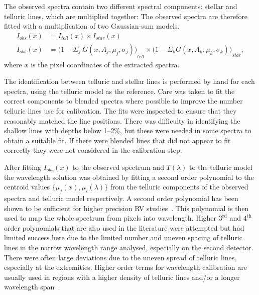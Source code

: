 The observed spectra contain two different spectral components: stellar and telluric lines, which are multiplied together: The observed spectra are therefore fitted with a multiplication of two Gaussian-sum models.
\begin{align}
I_{obs}(x) &= {I}_{tell}(x) \times {I}_{star}(x) \nonumber \\
I_{obs}(x) &= {\Big(1 - {\Sigma}_{j}\ G(x, A_{j}, {\mu}_{j}, {\sigma}_{j})\Big)}_{tell} \times {\Big(1 - {\Sigma}_{k} G(x, A_{k}, {\mu}_{k}, {\sigma}_{k})\Big)}_{star}, \label{eqn:obs}
\end{align}
where \(x\) is the pixel coordinates of the extracted spectra.

The identification between telluric and stellar lines is performed by hand for each spectra, using the telluric model as the reference. Care was taken to fit the correct components to blended spectra where possible to improve the number telluric lines use for calibration. The fits were inspected to ensure that they reasonably matched the line positions. There was difficulty in identifying the shallow lines with depths below 1--2\%, but these were needed in some spectra to obtain a suitable fit. If there were blended lines that did not appear to fit correctly they were not considered in the calibration step.

After fitting \(I_{obs}(x)\) to the observed spectrum and \(T(\lambda)\) to the telluric model the wavelength solution was obtained by fitting a second order polynomial to the centroid values \(\{\mu_{j}(x), \mu_{i}(\lambda)\}\) from the telluric components of the observed spectra and telluric model respectively. A second order polynomial has been shown to be sufficient for higher precision {RV} studies~\citep[e.g.][]{bean_groundbased_2010, figueira_radial_2010}. This polynomial is then used to map the whole spectrum from pixels into wavelength. Higher \(3^{\textrm{rd}}\) and \(4^{\textrm{th}}\) order polynomials that are also used in the literature \citet[e.g.][]{seifahrt_synthesising_2010, ulmer-moll_telluric_2018} were attempted but had limited success here due to the limited number and uneven spacing of telluric lines in the narrow wavelength range analysed, especially on the second detector. There were often large deviations due to the uneven spread of telluric lines, especially at the extremities. Higher order terms for wavelength calibration are usually used in regions with a higher density of telluric lines and/or a longer wavelength span~\citep{piskorz_evidence_2016, seifahrt_synthesising_2010, ulmer-moll_telluric_2018}.

